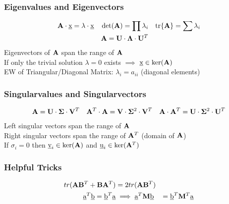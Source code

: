 \begin{mdframed}[style=eqbox]
\subsubsection{Eigenvalues and Eigenvectors}
\begin{align*}
  \mathbf{A} \cdot \underbar{x} = \lambda \cdot \underbar{x} && \det(\mathbf{A}) = \prod \lambda_i && \text{tr}\{\mathbf{A}\} = \sum \lambda_i\\
  &&\mathbf{A} = \mathbf{U} \cdot \mathbf{\Lambda} \cdot \mathbf{U}^{T}&&
\end{align*}
Eigenvectors of $\mathbf{A}$ span the range of $\mathbf{A}$\\
If only the trivial solution $\lambda = 0$ exists $\implies$ $\underbar{x} \in \text{ker}(\mathbf{A})$\\[0.25em]
EW of Triangular/Diagonal Matrix: $\lambda_i = a_{ii}$ (diagonal elements)

\subsubsection{Singularvalues and Singularvectors}
\begin{align*}
  \mathbf{A} = \mathbf{U} \cdot \mathbf{\Sigma} \cdot \mathbf{V}^{T} && \mathbf{A}^{T} \cdot \mathbf{A} = \mathbf{V} \cdot \mathbf{\Sigma}^{2} \cdot \mathbf{V}^{T} && \mathbf{A} \cdot \mathbf{A}^{T} = \mathbf{U} \cdot \mathbf{\Sigma}^{2} \cdot \mathbf{U}^{T}
\end{align*}
Left singular vectors span the range of $\mathbf{A}$\\
Right singular vectors span the range of $\mathbf{A}^{T}$ (domain of $\mathbf{A}$)\\
If $\sigma_i = 0$ then $\underbar{v}_i \in \text{ker}(\mathbf{A})$ and $\underbar{u}_i \in \text{ker}(\mathbf{A}^{T})$

\subsubsection{Helpful Tricks}
\vspace*{-10pt}
\begin{align*}
  tr(\mathbf{A}\mathbf{B}^T + \mathbf{B}\mathbf{A}^T) &= 2tr(\mathbf{A}\mathbf{B}^T)\\
  \underbar{a}^T\underbar{b} = \underbar{b}^T\underbar{a} &\implies \underbar{a}^T \mathbf{M} \underbar{b} &= \underbar{b}^T \mathbf{M}^T \underbar{a}
\end{align*}
\end{mdframed}